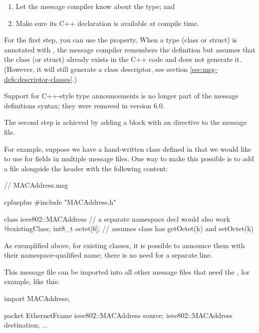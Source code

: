 \begin{enumerate}
   \item Let the message compiler know about the type; and
   \item Make sure its C++ declaration is available at compile time.
\end{enumerate}

For the first step, you can use the  property. When a type
(class or struct) is annotated with , the message compiler
remembers the definition but assumes that the class (or struct) already exists
in the C++ code and does not generate it. (However, it will still generate a
class descriptor, see section \ref{sec:msg-defs:descriptor-classes}.)

\begin{note}
Support for C++-style type announcements is no longer part of the message
definitions syntax; they were removed in {\opp} version 6.0.
\end{note}

The second step is achieved by adding a  block with an
 directive to the message file.

For example, suppose we have a hand-written  class
defined in  that we would like to use for fields in multiple
message files. One way to make this possible is to add a 
file alongside the header with the following content:

\begin{msg}
// MACAddress.msg

cplusplus {{
#include "MACAddress.h"
}}

class ieee802::MACAddress  // a separate namespace decl would also work
{
    @existingClass;
    int8_t octet[6]; // assumes class has getOctet(k) and setOctet(k)
}
\end{msg}

As exemplified above, for existing classes, it is possible to announce them with
their namespace-qualified name; there is no need for a separate
 line.

This message file can be imported into all other message files that need the
, for example, like this:

\begin{msg}
import MACAddress;

packet EthernetFrame {
    ieee802::MACAddress source;
    ieee802::MACAddress destination;
    ...
}
\end{msg}


